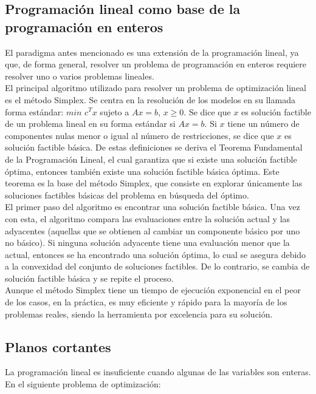 \documentclass[12pt]{report}
\begin{document}
\subsection{Programación lineal como base de la programación en enteros}

El paradigma antes mencionado es una extensión de la programación lineal, ya que, de forma general, resolver un problema de programación en enteros requiere resolver uno o varios problemas lineales.\\

El principal algoritmo utilizado para resolver un problema de optimización lineal es el método Simplex. Se centra en la resolución de los modelos en su llamada forma estándar: $min$ $c^Tx$ sujeto a $Ax=b$, $x\geq 0$.  Se dice que $x$ es solución factible de un problema lineal en su forma estándar si $Ax=b$. Si $x$ tiene un número de componentes nulas menor o igual al número de restricciones, se dice que $x$ es solución factible básica. De estas definiciones se deriva el Teorema Fundamental de la Programación Lineal, el cual garantiza que si existe una solución factible óptima, entonces también existe una solución factible básica óptima. Este teorema es la base del método Simplex, que consiste en explorar únicamente las soluciones factibles básicas del problema en búsqueda del óptimo.\\

El primer paso del algoritmo es encontrar una solución factible básica. Una vez con esta, el algoritmo compara las evaluaciones entre la solución actual y las adyacentes (aquellas que se obtienen al cambiar un componente básico por uno no básico). Si ninguna solución adyacente tiene una evaluación menor que la actual, entonces se ha encontrado una solución óptima, lo cual se asegura debido a la convexidad del conjunto de soluciones factibles. De lo contrario, se cambia de solución factible básica y se repite el proceso.\\

Aunque el método Simplex tiene un tiempo de ejecución exponencial en el peor de los casos, en la práctica, es muy eficiente y rápido para la mayoría de los problemas reales, siendo la herramienta por excelencia para su solución. 

\subsection{Planos cortantes}

La programación lineal es insuficiente cuando algunas de las variables son enteras. En el siguiente problema de optimización:
\end{document}
